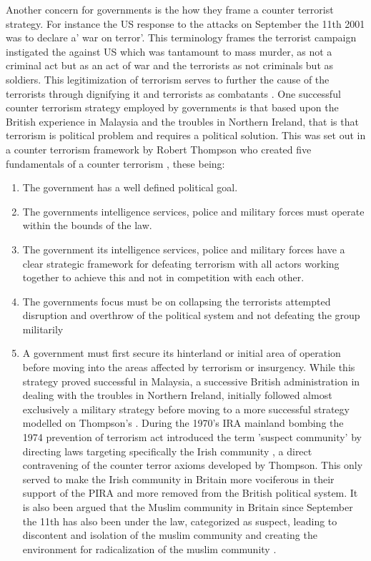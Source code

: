 Another concern for governments is the how they frame a counter terrorist strategy. For instance the US response to the attacks on September the 11th 2001 was to declare a' war on terror'. This terminology frames the terrorist campaign instigated the against US which was tantamount to mass murder, as not a criminal act but as an act of war and the terrorists as not criminals but as soldiers. This legitimization of terrorism serves to further the cause of the terrorists through dignifying it and terrorists as combatants \citep{moeller2009packaging}. One successful counter terrorism  strategy employed by governments is that based upon the British experience in Malaysia and the troubles in Northern Ireland, that is that terrorism is political problem and requires a political solution. This was set out in a counter terrorism framework by Robert Thompson \citep{hamilton1998art} who created five fundamentals of a counter terrorism \citep{thompson1966defeating}, these being:
\begin{enumerate}
\item The government has a well defined political goal.
\item The governments intelligence services, police and military forces must operate within the bounds of the law.
\item The government its intelligence services, police and military forces have a clear strategic framework for defeating terrorism with all actors working together to achieve this and not in competition with each other.
\item The governments focus must be on collapsing  the terrorists attempted disruption and overthrow of the political system and not defeating the group militarily
\item A government must first secure its hinterland or initial area of operation before moving into the areas affected by terrorism or insurgency.
While this strategy proved successful in Malaysia, a successive British administration in dealing with the troubles in Northern Ireland, initially followed almost exclusively a military strategy before moving to a more successful strategy modelled on Thompson's \citep{lafree2009impact}. During the 1970's IRA mainland bombing the 1974 prevention of terrorism act introduced the term 'suspect community' by directing  laws targeting specifically the Irish community \citep{hillyard1993suspect}, a direct contravening of the counter terror axioms developed by Thompson. This only served to make the Irish community in Britain more vociferous in their support of the PIRA and more removed from the British political system. It is also been argued that the Muslim  community in Britain since September the 11th has also been under the law, categorized as suspect, leading to discontent and isolation of the muslim community and creating the environment for radicalization of the muslim community \citep{pantazis2009old}.
\end{enumerate}
